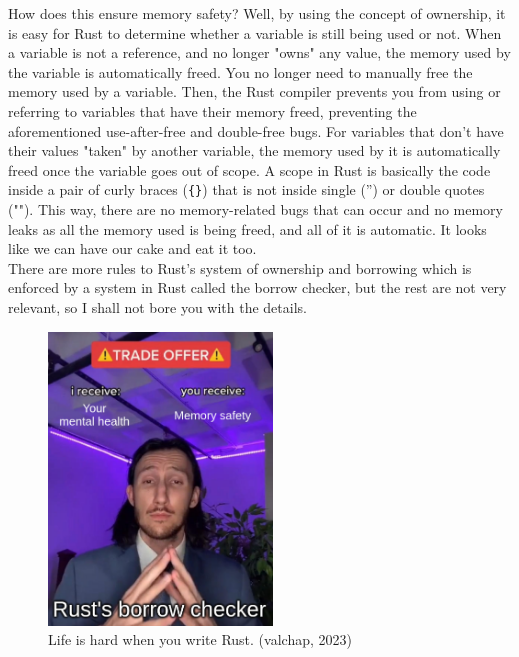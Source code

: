 \documentclass[11pt]{article}
\makeatletter
\newcommand{\citeprocitem}[2]{\hyper@linkstart{cite}{citeproc_bib_item_#1}#2\hyper@linkend}
\makeatother
\begin{document}
 \newpage

How does this ensure memory safety? Well, by using the concept
of ownership, it is easy for Rust to determine whether a variable
is still being used or not. When a variable is not a reference,
and no longer "owns" any value, the memory used by the variable
is automatically freed. You no longer need to manually free
the memory used by a variable. Then, the Rust compiler prevents you
from using or referring to variables that have their memory freed,
preventing the aforementioned use-after-free and double-free bugs.
For variables that don't have their values "taken" by another
variable, the memory used by it is automatically freed once
the variable goes out of scope. A scope in Rust is basically
the code inside a pair of curly braces (\texttt{\{\}}) that is not
inside single ('') or double quotes ("").
This way, there are no memory-related bugs that can occur
and no memory leaks as all the memory used is being freed,
and all of it is automatic. It looks like we can have our
cake and eat it too.  \\

There are more rules to Rust's system of ownership and
borrowing which is enforced by a system in Rust called
the borrow checker, but the rest are not very relevant,
so I shall not bore you with the details.

\begin{figure}[htbp]
\centering
\includegraphics[height=21em]{./images/rust-borrow-checker-in-a-nutshell.png}
\caption{Life is hard when you write Rust. (\citeprocitem{41}{valchap, 2023})}
\end{figure}

 \newpage
\end{document}
